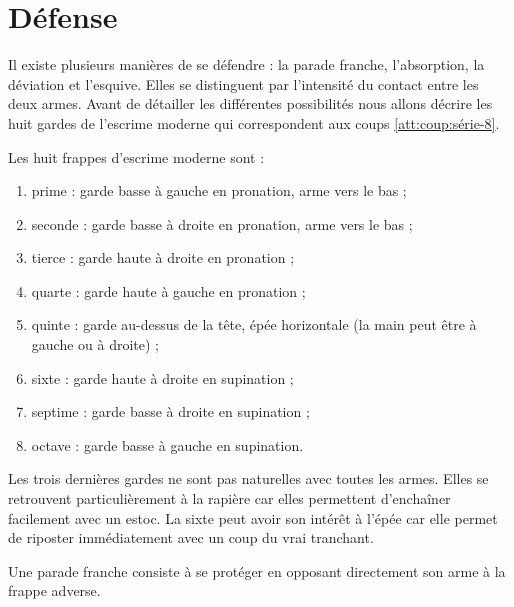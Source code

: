 \section{Défense}



Il existe plusieurs manières de se défendre : la parade franche, l'absorption, la déviation et l'esquive.
Elles se distinguent par l'intensité du contact entre les deux armes.
Avant de détailler les différentes possibilités nous allons décrire les huit gardes de l'escrime moderne qui correspondent aux coups \ref{att:coup:série-8}.


\begin{garde}
\label{att:garde:escrime-moderne}

\noindent
Les huit frappes d'escrime moderne sont :
\begin{enumerate}
	\item prime : garde basse à gauche en pronation, arme vers le bas ;
	\item seconde : garde basse à droite en pronation, arme vers le bas ;
	\item tierce : garde haute à droite en pronation ;
	\item quarte : garde haute à gauche en pronation ;
	\item quinte : garde au-dessus de la tête, épée horizontale (la main peut être à gauche ou à droite) ;
	\item sixte : garde haute à droite en supination ;
	\item septime : garde basse à droite en supination ;
	\item octave : garde basse à gauche en supination.
\end{enumerate}
\end{garde}


Les trois dernières gardes ne sont pas naturelles avec toutes les armes.
Elles se retrouvent particulièrement à la rapière car elles permettent d'enchaîner facilement avec un estoc.
La sixte peut avoir son intérêt à l'épée car elle permet de riposter immédiatement avec un coup du vrai tranchant.


\begin{definition}

Une parade franche consiste à se protéger en opposant directement son arme à la frappe adverse.

\end{definition}


